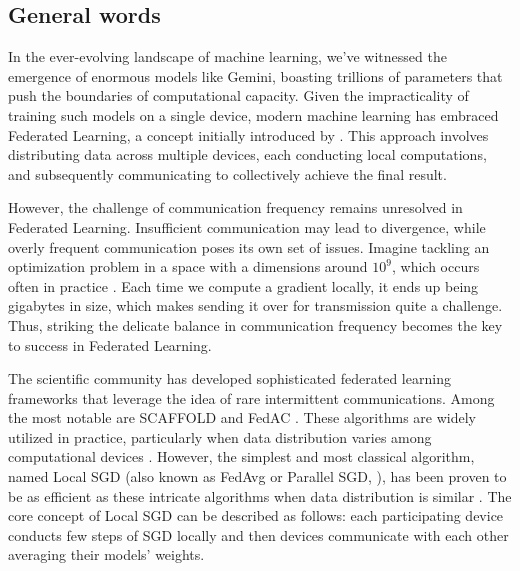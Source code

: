$ $\par

\subsection{General words}

In the ever-evolving landscape of machine learning, we've witnessed the emergence of enormous models like Gemini, boasting trillions of parameters that push the boundaries of computational capacity. Given the impracticality of training such models on a single device, modern machine learning has embraced Federated Learning, a concept initially introduced by \cite{McMahan}. This approach involves distributing data across multiple devices, each conducting local computations, and subsequently communicating to collectively achieve the final result.

\vspace{10pt}

However, the challenge of communication frequency remains unresolved in Federated Learning. Insufficient communication may lead to divergence, while overly frequent communication poses its own set of issues. Imagine tackling an optimization problem in a space with a dimensions around $10^9$, which occurs often in practice \citep{shahid2021communication}. Each time we compute a gradient locally, it ends up being gigabytes in size, which makes sending it over for transmission quite a challenge. Thus, striking the delicate balance in communication frequency becomes the key to success in Federated Learning.

\vspace{10pt}

The scientific community has developed sophisticated federated learning frameworks that leverage the idea of rare intermittent communications. Among the most notable are SCAFFOLD \citep{Scaffold} and FedAC \citep{FedAC}. These algorithms are widely utilized in practice, particularly when data distribution varies among computational devices \citep{Hospitals}. However, the simplest and most classical algorithm, named Local SGD (also known as FedAvg or Parallel SGD, \cite{Mangasarian}), has been proven to be as efficient as these intricate algorithms when data distribution is similar \citep{KEK LOL}. 
The core concept of Local SGD can be described as follows: each participating device conducts few steps of SGD locally and then devices communicate with each other averaging their models' weights.

\vspace{10pt}

